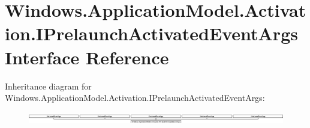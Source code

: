 \hypertarget{interface_windows_1_1_application_model_1_1_activation_1_1_i_prelaunch_activated_event_args}{}\section{Windows.\+Application\+Model.\+Activation.\+I\+Prelaunch\+Activated\+Event\+Args Interface Reference}
\label{interface_windows_1_1_application_model_1_1_activation_1_1_i_prelaunch_activated_event_args}
Inheritance diagram for Windows.\+Application\+Model.\+Activation.\+I\+Prelaunch\+Activated\+Event\+Args\+:\begin{figure}[H]
\begin{center}
\leavevmode
\includegraphics[height=0.547677cm]{interface_windows_1_1_application_model_1_1_activation_1_1_i_prelaunch_activated_event_args}
\end{center}
\end{figure}
